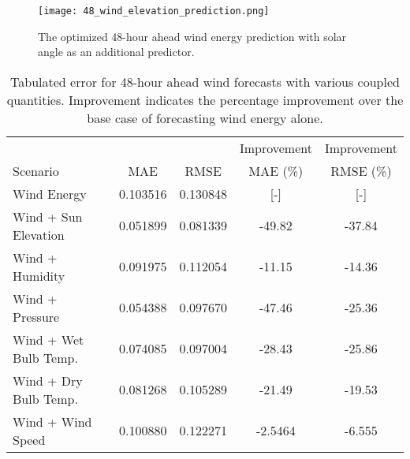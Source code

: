 \begin{figure*}[ht]
  \centering
  \texttt{[image: 48\_wind\_elevation\_prediction.png]}
  \caption{The optimized 48-hour ahead wind energy prediction with solar angle as an additional predictor.}
  \label{fig:wind48}
\end{figure*}
  \begin{table*}[ht]
    \centering
    \caption{Tabulated error for 48-hour ahead wind forecasts with various coupled quantities. Improvement indicates the percentage improvement over the base case of forecasting wind energy alone.}
    \label{tab:wind48}
    \begin{tabular}{l|c|c|c|c}
      &  & & Improvement & Improvement \\
      Scenario  & MAE & RMSE & MAE (\%) & RMSE (\%)\\
      \hline
      Wind Energy & 0.103516 & 0.130848 & [-] & [-] \\
      Wind + Sun Elevation & 0.051899 & 0.081339 & -49.82 & -37.84\\
      Wind + Humidity & 0.091975 & 0.112054 & -11.15 & -14.36\\
      Wind + Pressure & 0.054388 & 0.097670 & -47.46 & -25.36\\
      Wind + Wet Bulb Temp. & 0.074085 & 0.097004 & -28.43 & -25.86\\
      Wind + Dry Bulb Temp. & 0.081268 & 0.105289 & -21.49 & -19.53\\
      Wind + Wind Speed & 0.100880 & 0.122271 & -2.5464 &-6.555 \\
    \end{tabular}
  \end{table*}
